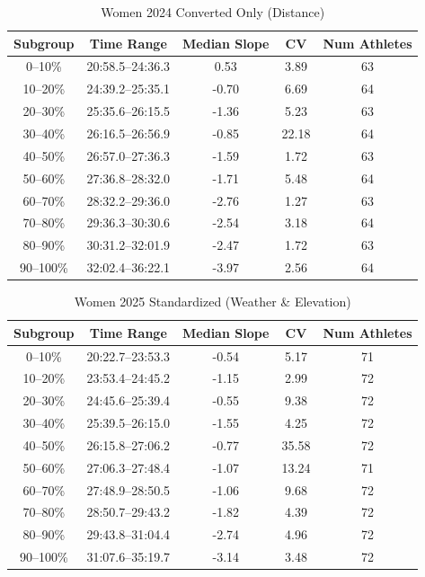 \documentclass[suppldata]{interact}
\theoremstyle{plain}%
\theoremstyle{definition}
\theoremstyle{remark}
\begin{document}
\begin{table}[htbp]
\renewcommand{\arraystretch}{1.2}
\begin{tabular}{c c c c c}
\toprule
Subgroup& Time Range & Median Slope & CV& Num Athletes \\
\midrule
0--10\%   & 20:58.5--24:36.3 &  0.53 & 3.89  & 63 \\
    10--20\%  & 24:39.2--25:35.1 & -0.70 & 6.69  & 64 \\
    20--30\%  & 25:35.6--26:15.5 & -1.36 & 5.23  & 63 \\
    30--40\%  & 26:16.5--26:56.9 & -0.85 & 22.18 & 64 \\
    40--50\%  & 26:57.0--27:36.3 & -1.59 & 1.72  & 63 \\
    50--60\%  & 27:36.8--28:32.0 & -1.71 & 5.48  & 64 \\
    60--70\%  & 28:32.2--29:36.0 & -2.76 & 1.27  & 63 \\
    70--80\%  & 29:36.3--30:30.6 & -2.54 & 3.18  & 64 \\
    80--90\%  & 30:31.2--32:01.9 & -2.47 & 1.72  & 63 \\
    90--100\% & 32:02.4--36:22.1 & -3.97 & 2.56  & 64 \\
\bottomrule
\end{tabular}
\centering
\caption{Women 2024 Converted Only (Distance)}
\label{tab:women_2024_converted}
\end{table}

\begin{table}[htbp]
\renewcommand{\arraystretch}{1.2}
\begin{tabular}{c c c c c}
\toprule
Subgroup& Time Range & Median Slope & CV& Num Athletes \\
\midrule
0--10\%   & 20:22.7--23:53.3 & -0.54 & 5.17  & 71 \\
    10--20\%  & 23:53.4--24:45.2 & -1.15 & 2.99  & 72 \\
    20--30\%  & 24:45.6--25:39.4 & -0.55 & 9.38  & 72 \\
    30--40\%  & 25:39.5--26:15.0 & -1.55 & 4.25  & 72 \\
    40--50\%  & 26:15.8--27:06.2 & -0.77 & 35.58 & 72 \\
    50--60\%  & 27:06.3--27:48.4 & -1.07 & 13.24 & 71 \\
    60--70\%  & 27:48.9--28:50.5 & -1.06 & 9.68  & 72 \\
    70--80\%  & 28:50.7--29:43.2 & -1.82 & 4.39  & 72 \\
    80--90\%  & 29:43.8--31:04.4 & -2.74 & 4.96  & 72 \\
    90--100\% & 31:07.6--35:19.7 & -3.14 & 3.48  & 72 \\
\bottomrule
\end{tabular}
\centering
\caption{Women 2025 Standardized (Weather \& Elevation)}
\label{tab:women_2025_stand}
\end{table}
\end{document}
